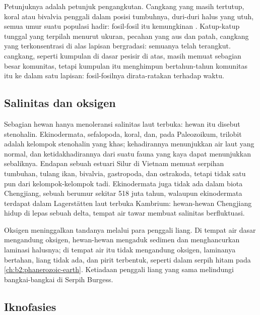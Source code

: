 Petunjuknya adalah petunjuk pengangkutan. Cangkang yang masih tertutup, koral atau bivalvia penggali dalam
posisi tumbuhnya, duri-duri halus yang utuh, semua umur suatu populasi hadir: fosil-fosil itu
kemungkinan . Katup-katup tunggal yang terpilah menurut ukuran, pecahan yang aus dan patah, cangkang yang
terkonsentrasi di alas lapisan bergradasi: semuanya telah terangkut.  cangkang, seperti
kumpulan di dasar pesisir di atas, masih memuat sebagian besar komunitas, tetapi kumpulan itu menghimpun bertahun-tahun
komunitas itu ke dalam satu lapisan: fosil-fosilnya dirata-ratakan terhadap waktu.

\subsection*{Salinitas dan oksigen}

Sebagian hewan hanya menoleransi salinitas laut terbuka: hewan itu disebut stenohalin. Ekinodermata,
sefalopoda, koral, dan, pada Paleozoikum, trilobit adalah kelompok stenohalin yang khas; kehadirannya
menunjukkan air laut yang normal, dan ketidakhadirannya dari suatu fauna yang kaya dapat menunjukkan sebaliknya.
Endapan sebuah estuari Silur di Vietnam memuat serpihan tumbuhan, tulang ikan, bivalvia, gastropoda,
dan ostrakoda, tetapi tidak satu pun dari kelompok-kelompok tadi. Ekinodermata juga tidak ada dalam biota Chengjiang,
sebuah  berumur sekitar 518 juta tahun, walaupun ekinodermata terdapat dalam Lagerstätten laut terbuka
Kambrium: hewan-hewan Chengjiang hidup di lepas sebuah delta, tempat air tawar membuat salinitas berfluktuasi.

Oksigen meninggalkan tandanya melalui para penggali liang. Di tempat air dasar mengandung oksigen, hewan-hewan mengaduk
sedimen dan menghancurkan laminasi halusnya; di tempat air itu tidak mengandung oksigen, laminanya bertahan, liang
tidak ada, dan pirit terbentuk, seperti dalam serpih hitam  pada
\cref{ch:b2:phanerozoic-earth}. Ketiadaan penggali liang yang sama melindungi bangkai-bangkai di Serpih
Burgess.

\subsection*{Iknofasies}


